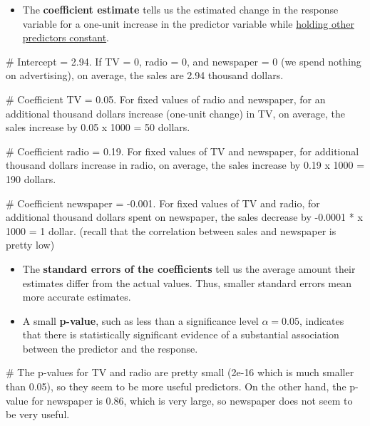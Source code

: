 \documentclass[
  letterpaper,
  DIV=11,
  numbers=noendperiod]{scrreprt}
\newenvironment{Shaded}{\begin{snugshade}}{\end{snugshade}}
\newcommand{\CommentTok}[1]{\textcolor[rgb]{0.37,0.37,0.37}{#1}}
\providecommand{\tightlist}{%
  \setlength{\itemsep}{0pt}\setlength{\parskip}{0pt}}\usepackage{longtable,booktabs,array}
\begin{document}
\begin{itemize}
\tightlist
\item
  The \textbf{coefficient estimate} tells us the estimated change in the
  response variable for a one-unit increase in the predictor variable
  while \ul{holding other predictors constant}.
\end{itemize}

\begin{Shaded}
\begin{Highlighting}[]
\CommentTok{\# Intercept = 2.94. If TV = 0, radio = 0, and newspaper = 0 (we spend nothing on advertising), on average, the sales are 2.94 thousand dollars.}

\CommentTok{\# Coefficient TV = 0.05. For fixed values of radio and newspaper, for an additional thousand dollars increase (one{-}unit change) in TV, on average, the sales increase by 0.05 x 1000 = 50 dollars.}

\CommentTok{\# Coefficient radio = 0.19. For fixed values of TV and newspaper, for additional thousand dollars increase in radio, on average, the sales increase by 0.19 x 1000 = 190 dollars.}

\CommentTok{\# Coefficient newspaper = {-}0.001. For fixed values of TV and radio, for additional thousand dollars spent on newspaper, the sales decrease by {-}0.0001 * x 1000 = 1 dollar. (recall that the correlation between sales and newspaper is pretty low)}
\end{Highlighting}
\end{Shaded}

\begin{itemize}
\item
  The \textbf{standard errors of the coefficients} tell us the average
  amount their estimates differ from the actual values. Thus, smaller
  standard errors mean more accurate estimates.
\item
  A small \textbf{p-value}, such as less than a significance level
  \(\alpha = 0.05\), indicates that there is statistically significant
  evidence of a substantial association between the predictor and the
  response.
\end{itemize}

\begin{Shaded}
\begin{Highlighting}[]
\CommentTok{\# The p{-}values for TV and radio are pretty small (2e{-}16 which is much smaller than 0.05), so they seem to be more useful predictors. On the other hand, the p{-}value for newspaper is 0.86, which is very large, so newspaper does not seem to be very useful.}
\end{Highlighting}
\end{Shaded}
\end{document}
